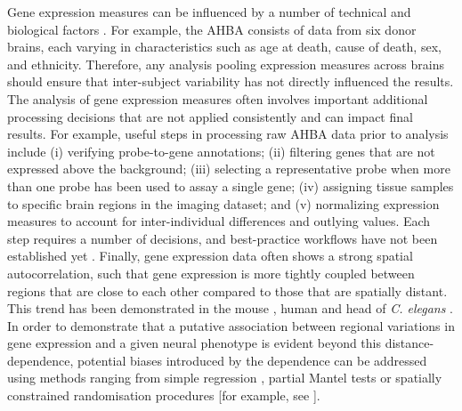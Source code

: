 Gene expression measures can be influenced by a number of technical and biological factors \citep{Fraser2005,Berchtold2008,Kumar2013,Trabzuni2013}.
For example, the AHBA consists of data from six donor brains, each varying in characteristics such as age at death, cause of death, sex, and ethnicity. Therefore, any analysis pooling expression measures across brains should ensure that inter-subject variability has not directly influenced the results. The analysis of gene expression measures often involves important additional processing decisions that are not applied consistently and can impact final results. For example, useful steps in processing raw AHBA data prior to analysis include (i) verifying probe-to-gene annotations; (ii) filtering genes that are not expressed above the background; (iii) selecting a representative probe when more than one probe has been used to assay a single gene; (iv) assigning tissue samples to specific brain regions in the imaging dataset; and (v) normalizing expression measures to account for inter-individual differences and outlying values. Each step requires a number of decisions, and best-practice workflows have not been established yet \citep{Arnatkeviciute2019}. 
Finally, gene expression data often shows a strong spatial autocorrelation, such that gene expression is more tightly coupled between regions that are close to each other compared to those that are spatially distant. This trend has been demonstrated in the mouse \citep{Fulcher2016}, human \citep{Richiardi2015,Krienen2016,Pantazatos2017,Vertes2016b,Arnatkeviciute2019} and head of \textit{C. elegans} \citep{Arnatkeviciute2018}.
In order to demonstrate that a putative association between regional variations in gene expression and a given neural phenotype is evident beyond this distance-dependence, potential biases introduced by the dependence can be addressed using methods ranging from simple regression \citep{Fulcher2016}, partial Mantel tests \citep{French2011,Ji2014,Fakhry2015} or spatially constrained randomisation procedures [for example, see \citep{Vertes2016b,Burt2017,Seidlitz2018,Arnatkeviciute2019}]. 

